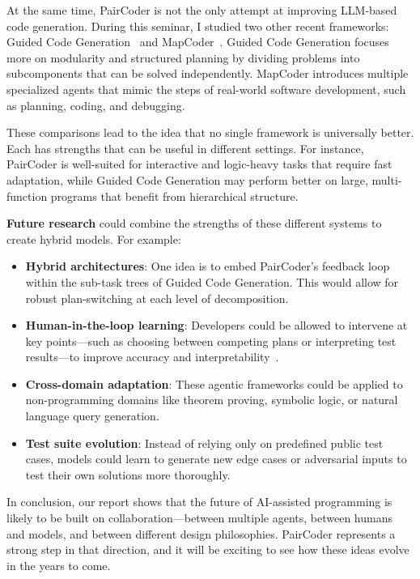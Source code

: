 \documentclass[11pt,a4paper]{article}
\begin{document}
At the same time, PairCoder is not the only attempt at improving LLM-based code generation. During this seminar, I studied two other recent frameworks: Guided Code Generation~\cite{almorsi2025guided} and MapCoder~\cite{islam2024mapcodermultiagentcodegeneration}. Guided Code Generation focuses more on modularity and structured planning by dividing problems into subcomponents that can be solved independently. MapCoder introduces multiple specialized agents that mimic the steps of real-world software development, such as planning, coding, and debugging.

These comparisons lead to the idea that no single framework is universally better. Each has strengths that can be useful in different settings. For instance, PairCoder is well-suited for interactive and logic-heavy tasks that require fast adaptation, while Guided Code Generation may perform better on large, multi-function programs that benefit from hierarchical structure.

\textbf{Future research} could combine the strengths of these different systems to create hybrid models. For example:
\begin{itemize}
  \item \textbf{Hybrid architectures}: One idea is to embed PairCoder’s feedback loop within the sub-task trees of Guided Code Generation. This would allow for robust plan-switching at each level of decomposition.
  \item \textbf{Human-in-the-loop learning}: Developers could be allowed to intervene at key points—such as choosing between competing plans or interpreting test results—to improve accuracy and interpretability~\cite{chen2024selfdebugging}.
  \item \textbf{Cross-domain adaptation}: These agentic frameworks could be applied to non-programming domains like theorem proving, symbolic logic, or natural language query generation.
  \item \textbf{Test suite evolution}: Instead of relying only on predefined public test cases, models could learn to generate new edge cases or adversarial inputs to test their own solutions more thoroughly.
\end{itemize}

In conclusion, our report shows that the future of AI-assisted programming is likely to be built on collaboration—between multiple agents, between humans and models, and between different design philosophies. PairCoder represents a strong step in that direction, and it will be exciting to see how these ideas evolve in the years to come.
\end{document}
